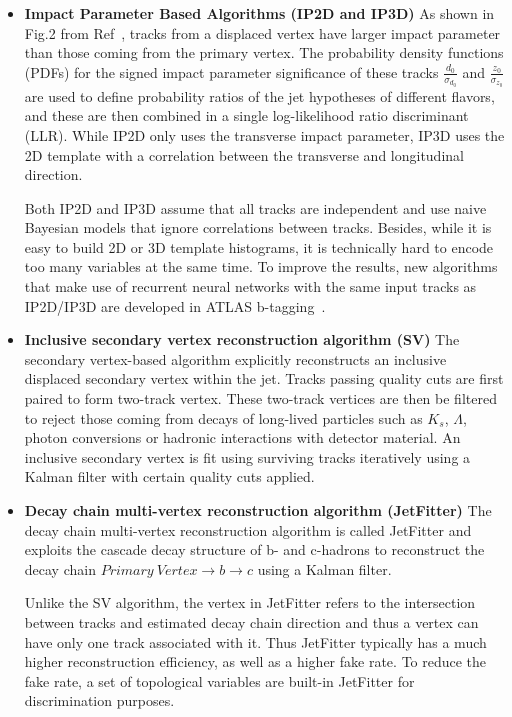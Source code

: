 \begin{itemize}
    \item \textbf{Impact Parameter Based Algorithms (IP2D and IP3D)} As shown in Fig.2 from Ref~\cite{ATL-PHYS-PUB-2015-022}, tracks from a displaced vertex have larger impact parameter than those coming from the primary vertex. The probability density functions (PDFs) for the signed impact parameter significance of these tracks $\frac{d_0}{\sigma_{d_0}}$ and $\frac{z_0}{\sigma_{z_0}}$ are used to define probability ratios of the jet hypotheses of different flavors, and these are then combined in a single log-likelihood ratio discriminant (LLR). While IP2D only uses the transverse impact parameter, IP3D uses the 2D template with a correlation between the transverse and longitudinal direction. 
    \par Both IP2D and IP3D assume that all tracks are independent and use naive Bayesian models that ignore correlations between tracks. Besides, while it is easy to build 2D or 3D template histograms, it is technically hard to encode too many variables at the same time. To improve the results, new algorithms that make use of recurrent neural networks with the same input tracks as IP2D/IP3D are developed in ATLAS b-tagging~\cite{ATL-PHYS-PUB-2017-003}.
    \item \textbf{Inclusive secondary vertex reconstruction algorithm (SV)} The secondary vertex-based algorithm explicitly reconstructs an inclusive displaced secondary vertex within the jet. Tracks passing quality cuts are first paired to form two-track vertex. These two-track vertices are then be filtered to reject those coming from decays of long-lived particles such as $K_s$, $\Lambda$, photon conversions or hadronic interactions with detector material. An inclusive secondary vertex is fit using surviving tracks iteratively using a Kalman filter with certain quality cuts applied.
    \item \textbf{Decay chain multi-vertex reconstruction algorithm (JetFitter)} The decay chain multi-vertex reconstruction algorithm is called JetFitter and exploits the cascade decay structure of b- and c-hadrons to reconstruct the decay chain $Primary\ Vertex \rightarrow b \rightarrow c$ using a Kalman filter. 
    \par Unlike the SV algorithm, the vertex in JetFitter refers to the intersection between tracks and estimated decay chain direction and thus a vertex can have only one track associated with it. Thus JetFitter typically has a much higher reconstruction efficiency, as well as a higher fake rate. To reduce the fake rate, a set of topological variables are built-in JetFitter for discrimination purposes. 
\end{itemize}       

